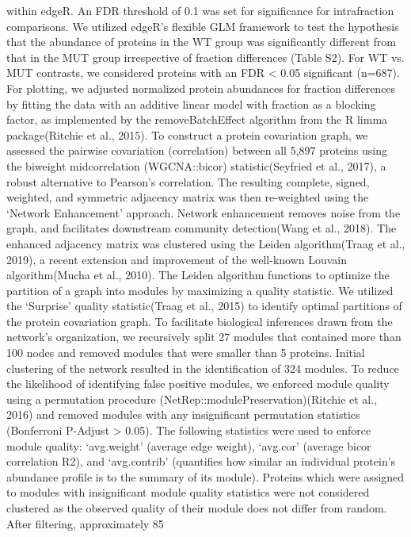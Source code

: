 within edgeR. An FDR threshold of 0.1 was set for significance for intrafraction
comparisons.  
We utilized edgeR’s flexible GLM framework to test the hypothesis that the
abundance of proteins in the WT group was significantly different from that in
the MUT group irrespective of fraction differences (Table S2). For WT vs. MUT
contrasts, we considered proteins with an FDR < 0.05 significant (n=687). For
plotting, we adjusted normalized protein abundances for fraction differences by
fitting the data with an additive linear model with fraction as a blocking
factor, as implemented by the removeBatchEffect algorithm from the R limma
package(Ritchie et al., 2015).
To construct a protein covariation graph, we assessed the pairwise covariation
(correlation) between all 5,897 proteins using the biweight midcorrelation
(WGCNA::bicor) statistic(Seyfried et al., 2017), a robust alternative to
Pearson’s correlation. The resulting complete, signed, weighted, and symmetric
adjacency matrix was then re-weighted using the ‘Network Enhancement’ approach.
Network enhancement removes noise from the graph, and facilitates downstream
community detection(Wang et al., 2018). 
The enhanced adjacency matrix was clustered using the Leiden algorithm(Traag et
al., 2019), a recent extension and improvement of the well-known Louvain
algorithm(Mucha et al., 2010). The Leiden algorithm functions to optimize the
partition of a graph into modules by maximizing a quality statistic. We utilized
the ‘Surprise’ quality statistic(Traag et al., 2015) to identify optimal
partitions of the protein covariation graph. To facilitate biological inferences
drawn from the network’s organization, we recursively split 27 modules that
contained more than 100 nodes and removed modules that were smaller than 5
proteins. Initial clustering of the network resulted in the identification of
324 modules.
To reduce the likelihood of identifying false positive modules, we enforced
module quality using a permutation procedure
(NetRep::modulePreservation)(Ritchie et al., 2016) and removed modules with any
insignificant permutation statistics (Bonferroni P-Adjust > 0.05). The following
statistics were used to enforce module quality: ‘avg.weight’ (average edge
weight), ‘avg.cor’ (average bicor correlation R2), and ‘avg.contrib’ (quantifies
how similar an individual protein’s abundance profile is to the summary of its
module). Proteins which were assigned to modules with insignificant module
quality statistics were not considered clustered as the observed quality of
their module does not differ from random. After filtering, approximately 85%

